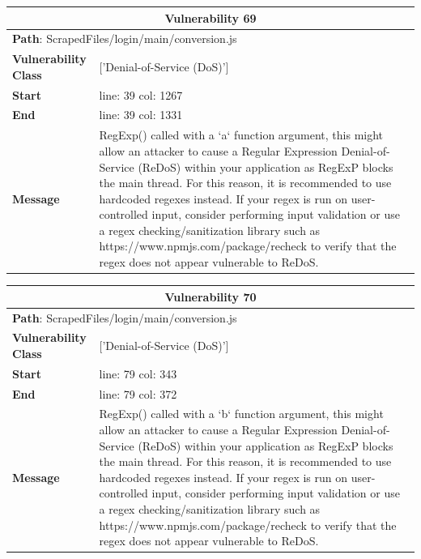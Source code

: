\documentclass[12pt]{article}
\begin{document}
\vspace{0.7cm}
\FloatBarrier
\begin{table}[!h]
\centering
\renewcommand{\arraystretch}{1.3}
\begin{tabular}{|l|p{10cm}|}
\hline
\multicolumn{2}{|c|}{\textbf{Vulnerability 69}} \\
\hline
\multicolumn{2}{|l|}{\textbf{Path}: ScrapedFiles/login/main/conversion.js} \\
\hline
\textbf{Vulnerability Class} & ['Denial-of-Service (DoS)'] \\
\hline
\textbf{Start} & line: 39 \quad col: 1267 \\
\hline
\textbf{End} & line: 39 \quad col: 1331 \\
\hline
\textbf{Message} & RegExp() called with a `a` function argument, this might allow an attacker to cause a Regular Expression Denial-of-Service (ReDoS) within your application as RegExP blocks the main thread. For this reason, it is recommended to use hardcoded regexes instead. If your regex is run on user-controlled input, consider performing input validation or use a regex checking/sanitization library such as https://www.npmjs.com/package/recheck to verify that the regex does not appear vulnerable to ReDoS. \\
\hline
\end{tabular}
\end{table}
\vspace{0.7cm}
\FloatBarrier
\begin{table}[!h]
\centering
\renewcommand{\arraystretch}{1.3}
\begin{tabular}{|l|p{10cm}|}
\hline
\multicolumn{2}{|c|}{\textbf{Vulnerability 70}} \\
\hline
\multicolumn{2}{|l|}{\textbf{Path}: ScrapedFiles/login/main/conversion.js} \\
\hline
\textbf{Vulnerability Class} & ['Denial-of-Service (DoS)'] \\
\hline
\textbf{Start} & line: 79 \quad col: 343 \\
\hline
\textbf{End} & line: 79 \quad col: 372 \\
\hline
\textbf{Message} & RegExp() called with a `b` function argument, this might allow an attacker to cause a Regular Expression Denial-of-Service (ReDoS) within your application as RegExP blocks the main thread. For this reason, it is recommended to use hardcoded regexes instead. If your regex is run on user-controlled input, consider performing input validation or use a regex checking/sanitization library such as https://www.npmjs.com/package/recheck to verify that the regex does not appear vulnerable to ReDoS. \\
\hline
\end{tabular}
\end{table}
\end{document}
